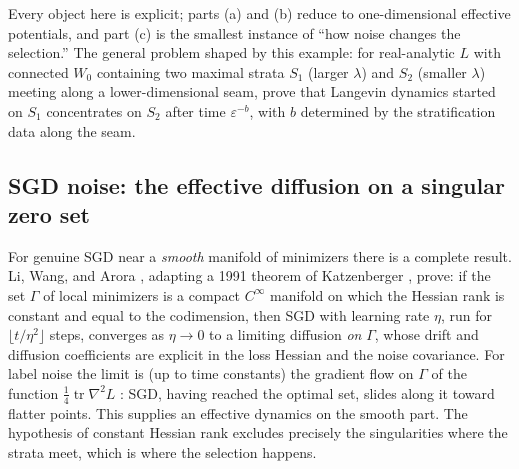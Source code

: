 \documentclass[11pt]{amsart}
\theoremstyle{plain}
\theoremstyle{definition}
\newcommand{\tr}{\operatorname{tr}}
\begin{document}
Every object here is explicit; parts (a) and (b) reduce to one-dimensional effective potentials, and part (c) is the smallest instance of ``how noise changes the selection.'' The general problem shaped by this example: for real-analytic $L$ with connected $W_0$ containing two maximal strata $S_1$ (larger $\lambda$) and $S_2$ (smaller $\lambda$) meeting along a lower-dimensional seam, prove that Langevin dynamics started on $S_1$ concentrates on $S_2$ after time $\varepsilon^{-b}$, with $b$ determined by the stratification data along the seam.

\subsection{SGD noise: the effective diffusion on a singular zero set}\label{sec:katzenberger}

For genuine SGD near a \emph{smooth} manifold of minimizers there is a complete result. Li, Wang, and Arora \cite{liwangarora2022}, adapting a 1991 theorem of Katzenberger \cite{katzenberger1991}, prove: if the set $\Gamma$ of local minimizers is a compact $C^\infty$ manifold on which the Hessian rank is constant and equal to the codimension, then SGD with learning rate $\eta$, run for $\lfloor t / \eta^2 \rfloor$ steps, converges as $\eta \to 0$ to a limiting diffusion \emph{on} $\Gamma$, whose drift and diffusion coefficients are explicit in the loss Hessian and the noise covariance. For label noise the limit is (up to time constants) the gradient flow on $\Gamma$ of the function $\tfrac14 \tr \nabla^2 L$ \cite{blanc2020, damian2021, liwangarora2022}: SGD, having reached the optimal set, slides along it toward flatter points. This supplies an effective dynamics on the smooth part. The hypothesis of constant Hessian rank excludes precisely the singularities where the strata meet, which is where the selection happens.
\end{document}
